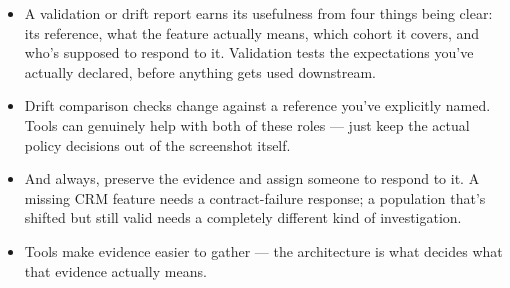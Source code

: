 \documentclass[11pt,a4paper]{article}
\begin{document}
\begin{examplebox}[title after break={SPOKEN SCRIPT --- slide 52 continued}]
\begin{itemize}
\item A validation or drift report earns its usefulness from four things being clear: its reference, what the feature actually means, which cohort it covers, and who's supposed to respond to it. Validation tests the expectations you've actually declared, before anything gets used downstream.
\item Drift comparison checks change against a reference you've explicitly named. Tools can genuinely help with both of these roles — just keep the actual policy decisions out of the screenshot itself.
\item And always, preserve the evidence and assign someone to respond to it. A missing CRM feature needs a contract-failure response; a population that's shifted but still valid needs a completely different kind of investigation.
\item Tools make evidence easier to gather — the architecture is what decides what that evidence actually means.
\end{itemize}
\end{examplebox}
\par\noindent{\scriptsize\textcolor{teal!60!black}{Reading anchor: Bass, Ch. 11 / §14.1.5 · Group tool-showcase topic}}
\clearpage
\end{document}
